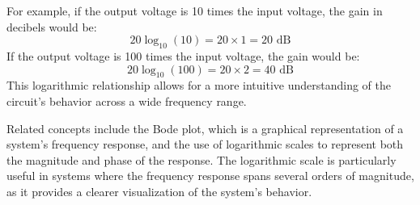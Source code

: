 For example, if the output voltage is 10 times the input voltage, the gain in decibels would be:
\[
20 \log_{10}(10) = 20 \times 1 = 20 \text{ dB}
\]
If the output voltage is 100 times the input voltage, the gain would be:
\[
20 \log_{10}(100) = 20 \times 2 = 40 \text{ dB}
\]
This logarithmic relationship allows for a more intuitive understanding of the circuit's behavior across a wide frequency range.

Related concepts include the Bode plot, which is a graphical representation of a system's frequency response, and the use of logarithmic scales to represent both the magnitude and phase of the response. The logarithmic scale is particularly useful in systems where the frequency response spans several orders of magnitude, as it provides a clearer visualization of the system's behavior.


